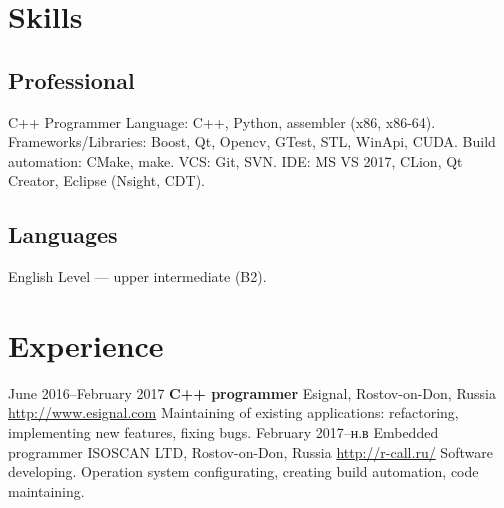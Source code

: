 \documentclass[11pt,a4paper]{moderncv}
\newcommand{\EngRus}[2]{#1}
\newcommand{\BirthPlaceOfValour}{\EngRus{Rostov-on-Don, Russia}{Ростов-на-Дону, Россия}}
\begin{document}
\maketitle

\section{\EngRus{Skills}{Навыки}}
  \subsection{\EngRus{Professional}{Профессиональные}}
    \cvline
    {\EngRus{C++ Programmer}{Программист C++}}
      {
      \EngRus{Language}{Языки}: C++, Python, assembler (x86, x86-64).\newline{}
      \EngRus{Frameworks/Libraries}{Фреймворки/Библиотеки}: Boost, Qt, Opencv, GTest, STL, WinApi, CUDA.\newline{}
      \EngRus{Build automation}{Системы автоматизации сборки}: CMake, make.\newline{}
      \EngRus{VCS}{Системы управления версиями}: Git, SVN.\newline{}
      IDE: MS VS 2017, CLion, Qt Creator, Eclipse (Nsight, CDT).
      }
  \subsection{\EngRus{Languages}{Языки}}
    \cvline
    {\EngRus{English}{Английский}}
      {
      \EngRus{Level}{Уровень} --- \EngRus{upper intermediate}{разговорный} (B2). \newline{}
      }

\section{\EngRus{Experience}{Опыт}}
\cventry
  {\EngRus{June}{Июнь} 2016--\EngRus{February}{Февраль} 2017}
  {\bfseries \EngRus{C++ programmer}{C++ программист}}
  {Esignal, \BirthPlaceOfValour}
  {\newline{}\url{http://www.esignal.com}}{}
  {\EngRus{Maintaining of existing applications: refactoring, implementing new features, fixing bugs.}{Поддержка текущего кода: рефакторинг, исправление багов и добавление новых возможностей.}}
\cventry
  {\EngRus{February}{Февраль} 2017--н.в}
  {\EngRus{Embedded programmer}{Программист микроконтроллеров}}
  {\EngRus{ISOSCAN LTD}{ООО "Изоскан"}, \BirthPlaceOfValour}
  {\newline{}\url{http://r-call.ru/}}{}
  {\EngRus{Software developing. Operation system configurating, creating build automation, code maintaining.}{Разработка программного обеспечения. Настройка операционных систем, систем сборки, поддержка текущего кода.}}
\end{document}
